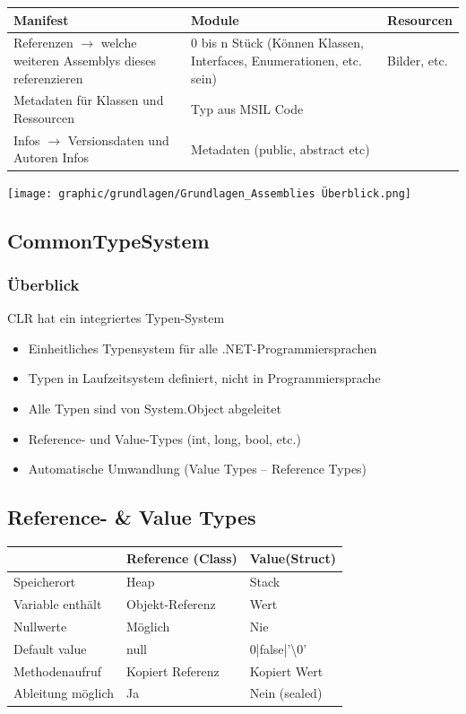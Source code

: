 \begin{tabular}{p{2.4cm} | p{2.4cm} | p{2.4cm}}
    \textcolor{OSTPink}{Manifest} & \textcolor{OSTPink}{Module} & \textcolor{OSTPink}{Resourcen}\\
    \hline
    Referenzen $\rightarrow$ welche weiteren Assemblys dieses referenzieren&0 bis n Stück (Können Klassen, Interfaces, Enumerationen, etc. sein)&Bilder, etc.\\
    Metadaten für Klassen und Ressourcen&Typ aus MSIL Code&\\
    Infos $\rightarrow$ Versionsdaten und Autoren Infos& Metadaten (public, abstract etc)&\\
\end{tabular}
\vspace{-8pt}
\begin{center}
\texttt{[image: graphic/grundlagen/Grundlagen\_Assemblies Überblick.png]}
\end{center}
\vspace{-8pt}

\subsection{CommonTypeSystem}
\subsubsection{Überblick}
CLR hat ein integriertes Typen-System
\begin{itemize}
    \item Einheitliches Typensystem für alle .NET-Programmiersprachen
    \item Typen in Laufzeitsystem definiert, nicht in Programmiersprache
    \item Alle Typen sind von System.Object abgeleitet
    \item Reference- und Value-Types (int, long, bool, etc.)
    \item Automatische Umwandlung (Value Types – Reference Types)
\end{itemize}

\subsection{Reference- \& Value Types}
    \begin{tabular}{| p{2.5cm}  p{2.5cm} | p{2.5cm}|}

        \hline
        &Reference (Class)&Value(Struct)\\
        \hline
        \hline
        Speicherort&Heap&Stack\\
        \hline
        Variable enthält&Objekt-Referenz&Wert\\
        \hline
        Nullwerte&Möglich&Nie\\
        \hline
        Default value&null&0|false|'\textbackslash0'\\
        \hline
        Methodenaufruf&Kopiert Referenz& Kopiert Wert\\
        \hline
        Ableitung möglich&Ja&Nein (sealed)\\
        \hline
    \end{tabular}




